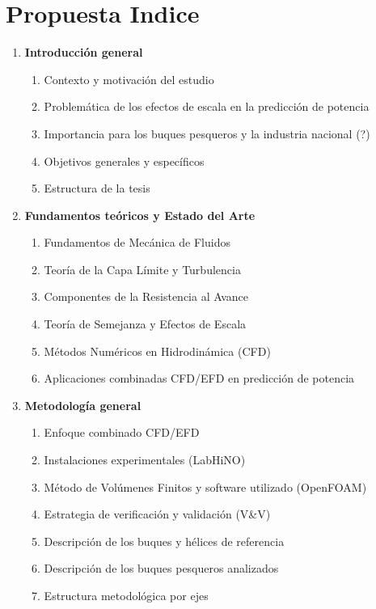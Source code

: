 \section*{Propuesta Indice}


\begin{enumerate}
  \item \textbf{Introducción general}
  \begin{enumerate}[label*=\arabic*.]
    \item Contexto y motivación del estudio
    \item Problemática de los efectos de escala en la predicción de potencia
    \item Importancia para los buques pesqueros y la industria nacional (?)
    \item Objetivos generales y específicos
    \item Estructura de la tesis
  \end{enumerate}

  \item \textbf{Fundamentos teóricos y Estado del Arte}
  \begin{enumerate}[label*=\arabic*.] 
    \item Fundamentos de Mecánica de Fluidos 
    \item Teoría de la Capa Límite y Turbulencia 
    \item Componentes de la Resistencia al Avance 
    \item Teoría de Semejanza y Efectos de Escala 
    \item Métodos Numéricos en Hidrodinámica (CFD) 
    \item Aplicaciones combinadas CFD/EFD en predicción de potencia 
  \end{enumerate} 

  \item \textbf{Metodología general}
  \begin{enumerate}[label*=\arabic*.]
    \item Enfoque combinado CFD/EFD
    \item Instalaciones experimentales (LabHiNO)
    \item Método de Volúmenes Finitos y software utilizado (OpenFOAM)
    \item Estrategia de verificación y validación (V\&V)
    \item Descripción de los buques y hélices de referencia
    \item Descripción de los buques pesqueros analizados
    \item Estructura metodológica por ejes
  \end{enumerate}


\end{enumerate}
